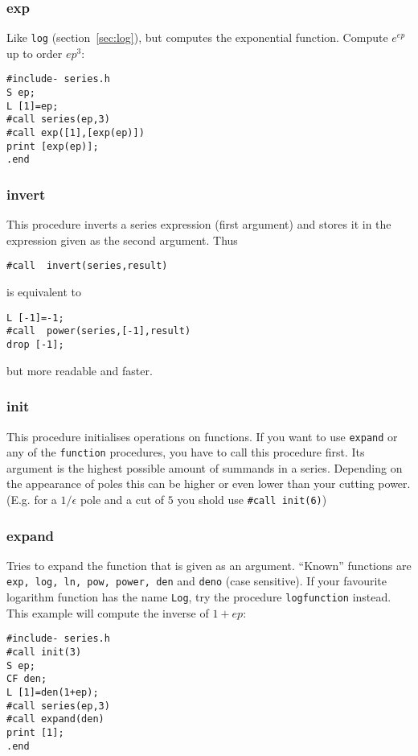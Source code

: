 \documentclass{article}
\begin{document}
\subsubsection{exp}
\label{sec:exp}

Like {\tt log} (section~\ref{sec:log}), but computes the
exponential function. Compute $e^{ep}$ up to order $ep^3$:
\begin{verbatim}
#include- series.h
S ep;
L [1]=ep;
#call series(ep,3)
#call exp([1],[exp(ep)])
print [exp(ep)];
.end
\end{verbatim}


\subsubsection{invert}
\label{sec:invert}

This procedure inverts a series expression (first argument) and stores
it in the expression given as the second argument. Thus
\begin{verbatim}
#call  invert(series,result)
\end{verbatim}
is equivalent to 
\begin{verbatim}
L [-1]=-1;
#call  power(series,[-1],result)
drop [-1];
\end{verbatim}
but more readable and faster.

\subsubsection{init}
\label{sec:invert}

This procedure initialises operations on functions. If you want to use
{\tt expand} or any of the {\tt *function} procedures, you have to call
this procedure first. Its argument is the highest possible amount of
summands in a series. Depending on the appearance of poles this can be
higher or even lower than your cutting power. (E.g. for a $1/\epsilon$
pole and a cut of $5$ you shold use {\tt \#call init(6)})

\subsubsection{expand}
\label{sec:expand}

Tries to expand the function that is given as an argument. ``Known''
functions are {\tt exp, log, ln, pow, power, den} and {\tt deno} (case sensitive). If
your favourite logarithm function has the name {\tt Log}, try the
procedure {\tt logfunction} instead. This example will compute the
inverse of $1+ep$:
\begin{verbatim}
#include- series.h
#call init(3)
S ep;
CF den;
L [1]=den(1+ep);
#call series(ep,3)
#call expand(den)
print [1];
.end
\end{verbatim}
\end{document}
